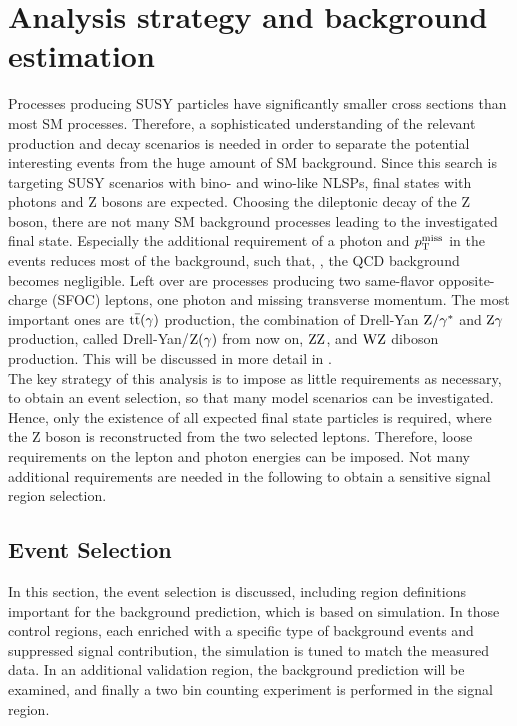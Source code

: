 \chapter{Analysis strategy and background estimation}\label{chap:analysis}
\minitoc
Processes producing SUSY particles have significantly smaller cross sections than most SM processes. Therefore, a sophisticated understanding of the relevant production and decay scenarios is needed in order to separate the potential interesting events from the huge amount of SM background. Since this search is targeting SUSY scenarios with bino- and wino-like NLSPs, final states with photons and Z bosons are expected. Choosing the dileptonic decay of the Z boson, there are not many SM background processes leading to the investigated final state. Especially the additional requirement of a photon and $p_{\mathrm{T}}^\text{miss}$ in the events reduces most of the background, such that, \eg, the QCD background becomes negligible. Left over are processes producing two same-flavor opposite-charge (SFOC) leptons, one photon and missing transverse momentum. The most important ones are ${\mathrm{t}\overline{\mathrm{t}}}(\gamma)$ production, the combination of Drell-Yan $\mathrm{Z}/\gamma^{*}$ and $\mathrm{Z}\gamma$ production, called  Drell-Yan/$\mathrm{Z}(\gamma)$ from now on, $\mathrm{Z}\mathrm{Z}$, and $\mathrm{W}\mathrm{Z}$ diboson production. This will be discussed in more detail in .\\
The key strategy of this analysis is to impose as little requirements as necessary, to obtain an event selection, so that many model scenarios can be investigated. Hence, only the existence of all expected final state particles is required, where the Z boson is reconstructed from the two selected leptons. Therefore, loose requirements on the lepton and photon energies can be imposed. Not many additional requirements are needed in the following to obtain a sensitive signal region selection.

\section{Event Selection}
In this section, the event selection is discussed, including region definitions important for the background prediction, which is based on simulation. In those control regions, each enriched with a specific type of background events and suppressed signal contribution, the simulation is tuned to match the measured data. In an additional validation region, the background prediction will be examined, and finally a two bin counting experiment is performed in the signal region.
